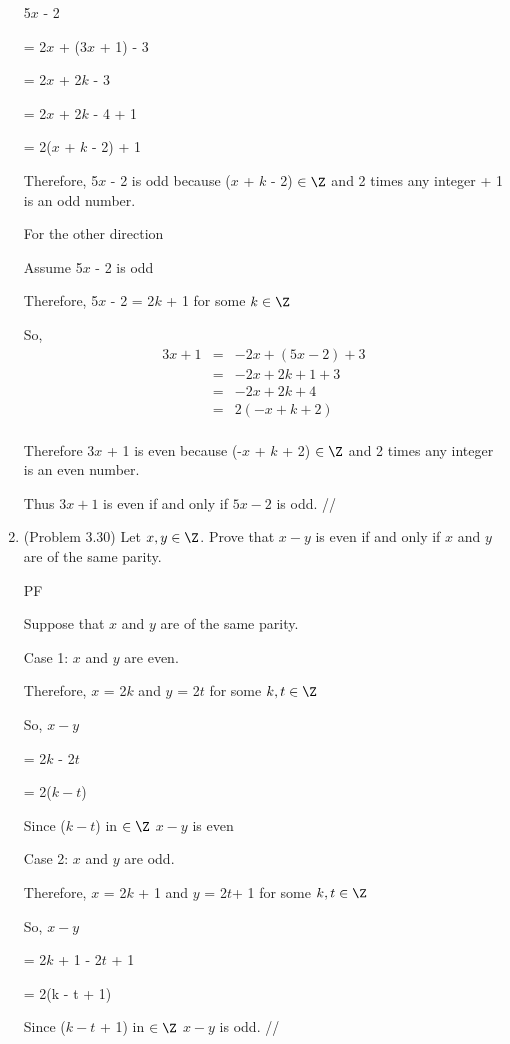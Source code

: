 \documentclass[12pt]{article}
\begin{document}
\begin{enumerate}
{ 5$x$ - 2 

= 2$x$ + (3$x$ + 1) - 3

= 2$x$ + 2$k$ - 3

= 2$x$ + 2$k$ - 4 + 1

= 2($x$ + $k$ - 2) + 1 

Therefore, 
5$x$ - 2 is odd because ($x$ + $k$ - 2) $\in \Z$  and 2 times any integer + 1 is an odd number.
}

{For the other direction

Assume 5$x$ - 2  is odd

Therefore, 5$x$ - 2 = 2$k$ + 1 for some $k \in \Z$

So, 
\begin{eqnarray} 3x + 1 & =  & -2x + (5x - 2) + 3 \nonumber \\
~ & = &  -2x + 2k + 1+ 3 \nonumber  \\
~ & = &  -2x + 2k + 4 \nonumber \\
~ & = &  2( -x +k + 2) \nonumber \\
\end{eqnarray}


Therefore
3$x$ + 1 is even because (-$x$ + $k$ + 2) $\in \Z$  and 2 times any integer is an even number.


Thus $3x + 1$ is even if and only if $5x - 2$ is odd.
//
}




\item (Problem 3.30) Let $x, y \in \Z$.  Prove that $x - y$ is even if and only if $x$ and $y$ are of the same parity.
{
PF

Suppose that $x$ and $y$ are of the same parity.

Case 1: $x$ and $y$ are even.

Therefore, $x$ = 2$k$ and $y$ = 2$t$  for some $k,t \in \Z$

So, $x - y$

= 2$k$ - 2$t$

= 2($k - t$)

Since ($k - t$) in $\in \Z$   $x - y$ is even


Case 2:  $x$ and $y$ are odd.

Therefore, $x$ = 2$k$ + 1 and $y$ = 2$t$+ 1  for some $k,t \in \Z$

So, $x - y$

= 2$k$ + 1 - 2$t$ + 1

= 2(k - t + 1)

Since ($k - t$ + 1) in $\in \Z$   $x - y$ is odd.  //

}
\end{enumerate}
\end{document}
